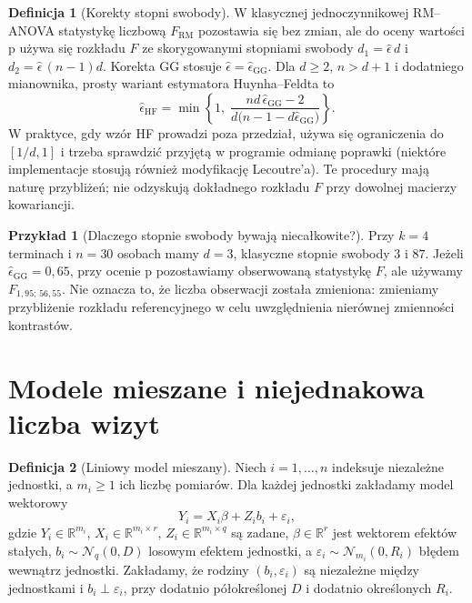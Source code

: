 \documentclass[11pt,a4paper,oneside]{report}
\numberwithin{equation}{chapter}
\theoremstyle{plain}
\theoremstyle{definition}
\newtheorem{definicja}{Definicja}[chapter]
\newtheorem{przyklad}{Przykład}[chapter]
\theoremstyle{remark}
\newcommand{\R}{\mathbb R}
\newcommand{\Normal}{\mathcal N}
\begin{document}
\begin{definicja}[Korekty stopni swobody]\label{def:gg-hf}
W klasycznej jednoczynnikowej RM--ANOVA statystykę liczbową $F_{\mathrm{RM}}$ pozostawia się bez zmian, ale do oceny wartości p używa się rozkładu $F$ ze skorygowanymi stopniami swobody $d_1=\widehat\epsilon\,d$ i $d_2=\widehat\epsilon\,(n-1)d$. Korekta GG stosuje $\widehat\epsilon=\widehat\epsilon_{\mathrm{GG}}$. Dla $d\ge2$, $n>d+1$ i dodatniego mianownika, prosty wariant estymatora Huynha--Feldta to
\[
 \widehat\epsilon_{\mathrm{HF}}=\min\left\{1,\;\frac{nd\,\widehat\epsilon_{\mathrm{GG}}-2}{d\bigl(n-1-d\widehat\epsilon_{\mathrm{GG}}\bigr)}\right\}.
\]
W praktyce, gdy wzór HF prowadzi poza przedział, używa się ograniczenia do $[1/d,1]$ i trzeba sprawdzić przyjętą w programie odmianę poprawki (niektóre implementacje stosują również modyfikację Lecoutre'a). Te procedury mają naturę przybliżeń; nie odzyskują dokładnego rozkładu $F$ przy dowolnej macierzy kowariancji.
\end{definicja}

\begin{przyklad}[Dlaczego stopnie swobody bywają niecałkowite?]
Przy $k=4$ terminach i $n=30$ osobach mamy $d=3$, klasyczne stopnie swobody $3$ i $87$. Jeżeli $\widehat\epsilon_{\mathrm{GG}}=0{,}65$, przy ocenie p pozostawiamy obserwowaną statystykę $F$, ale używamy $F_{1{,}95;\,56{,}55}$. Nie oznacza to, że liczba obserwacji została zmieniona: zmieniamy przybliżenie rozkładu referencyjnego w celu uwzględnienia nierównej zmienności kontrastów.
\end{przyklad}

\section{Modele mieszane i niejednakowa liczba wizyt}
\begin{definicja}[Liniowy model mieszany]\label{def:lmm}
Niech $i=1,\ldots,n$ indeksuje niezależne jednostki, a $m_i\ge1$ ich liczbę pomiarów. Dla każdej jednostki zakładamy model wektorowy
\[
 Y_i=X_i\beta+Z_i b_i+\varepsilon_i,
\]
gdzie $Y_i\in\R^{m_i}$, $X_i\in\R^{m_i\times r}$, $Z_i\in\R^{m_i\times q}$ są zadane, $\beta\in\R^r$ jest wektorem efektów stałych, $b_i\sim\Normal_q(0,D)$ losowym efektem jednostki, a $\varepsilon_i\sim\Normal_{m_i}(0,R_i)$ błędem wewnątrz jednostki. Zakładamy, że rodziny $(b_i,\varepsilon_i)$ są niezależne między jednostkami i $b_i\perp\varepsilon_i$, przy dodatnio półokreślonej $D$ i dodatnio określonych $R_i$.
\end{definicja}
\end{document}
